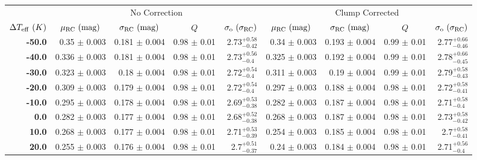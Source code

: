 \documentclass[fleqn,usenatbib]{mnras}
\begin{document}
\begin{table}
    \begin{tabular}{rrrrr|rrrr}
    \toprule
    {} & \multicolumn{4}{|c|}{No Correction} & \multicolumn{4}{|c|}{Clump Corrected} \\
    \cmidrule(lr){2-5}\cmidrule(lr){6-9}
    \multicolumn{1}{c}{$\Delta T_{\rm eff}\ (K)$} & \multicolumn{1}{c}{$\mu_{\rm RC}\ (\rm mag)$} & \multicolumn{1}{c}{$\sigma_{\rm RC}\ (\rm mag)$}  & \multicolumn{1}{c}{$Q$} &  \multicolumn{1}{c}{$\sigma_{\rm o}\ (\sigma_{\rm RC})$} & \multicolumn{1}{c}{$\mu_{\rm RC}\ (\rm mag)$} & \multicolumn{1}{c}{$\sigma_{\rm RC}\ (\rm mag)$}  & \multicolumn{1}{c}{$Q$} &  \multicolumn{1}{c}{$\sigma_{\rm o}\ (\sigma_{\rm RC})$} \\
    \midrule
        \textbf{-50.0} &   0.35 $\pm$ 0.003 &  0.181 $\pm$ 0.004 &  0.98 $\pm$ 0.01 &  2.73$_{-0.42}^{+0.58}$  &   0.34 $\pm$ 0.003 &   0.193 $\pm$ 0.004 &  0.99 $\pm$ 0.01 &   2.77$_{-0.46}^{+0.66}$ \\
        \textbf{-40.0} &  0.336 $\pm$ 0.003 &  0.181 $\pm$ 0.004 &  0.98 $\pm$ 0.01 &  2.73$_{- 0.4}^{+0.56}$  &  0.325 $\pm$ 0.003 &   0.192 $\pm$ 0.004 &  0.99 $\pm$ 0.01 &   2.78$_{-0.45}^{+0.66}$  \\
        \textbf{-30.0} &  0.323 $\pm$ 0.003 &   0.18 $\pm$ 0.004 &  0.98 $\pm$ 0.01 &  2.72$_{- 0.4}^{+0.54}$  &  0.311 $\pm$ 0.003 &    0.19 $\pm$ 0.004 &  0.99 $\pm$ 0.01 &   2.79$_{-0.43}^{+0.58}$ \\
        \textbf{-20.0} &  0.309 $\pm$ 0.003 &  0.179 $\pm$ 0.004 &  0.98 $\pm$ 0.01 &  2.72$_{- 0.4}^{+0.54}$  &  0.297 $\pm$ 0.003 &   0.188 $\pm$ 0.004 &  0.98 $\pm$ 0.01 &   2.72$_{-0.41}^{+0.58}$  \\
        \textbf{-10.0} &  0.295 $\pm$ 0.003 &  0.178 $\pm$ 0.004 &  0.98 $\pm$ 0.01 &  2.69$_{-0.38}^{+0.53}$  &  0.282 $\pm$ 0.003 &   0.187 $\pm$ 0.004 &  0.98 $\pm$ 0.01 &   2.71$_{- 0.4}^{+0.58}$ \\
        \textbf{0.0  } &  0.282 $\pm$ 0.003 &  0.177 $\pm$ 0.004 &  0.98 $\pm$ 0.01 &  2.68$_{-0.38}^{+0.52}$  &  0.268 $\pm$ 0.003 &   0.187 $\pm$ 0.004 &  0.98 $\pm$ 0.01 &   2.73$_{-0.42}^{+0.58}$  \\
        \textbf{10.0 } &  0.268 $\pm$ 0.003 &  0.177 $\pm$ 0.004 &  0.98 $\pm$ 0.01 &  2.71$_{-0.39}^{+0.53}$  &  0.254 $\pm$ 0.003 &   0.185 $\pm$ 0.004 &  0.98 $\pm$ 0.01 &    2.7$_{-0.41}^{+0.58}$ \\
        \textbf{20.0 } &  0.255 $\pm$ 0.003 &  0.176 $\pm$ 0.004 &  0.98 $\pm$ 0.01 &   2.7$_{-0.37}^{+0.51}$  &   0.24 $\pm$ 0.003 &   0.184 $\pm$ 0.004 &  0.98 $\pm$ 0.01 &   2.71$_{- 0.4}^{+0.56}$  \\

\end{tabular}
\end{table}
\end{document}
